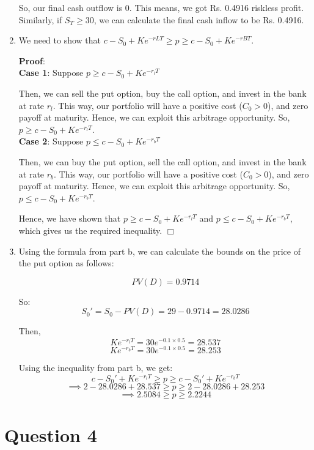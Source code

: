\documentclass[a4paper]{article}
\def\endproofmark{$\Box$}
\newenvironment{proof}{\par{\bf Proof}:}{\endproofmark\smallskip}
\begin{document}
\begin{enumerate}[label=(\alph*)]
    So, our final cash outflow is 0. This means, we got Rs. 0.4916 riskless profit. Similarly, if $S_T \geq 30$, we can calculate the final cash inflow to be Rs. 0.4916.


    \vspace{5mm}
    \item We need to show that $c - S_0 + Ke^{-rLT} \geq p \geq c - S_0 + Ke^{-rBT}$.

    \begin{proof}
        \\
        \textbf{Case 1}: Suppose $p \geq c - S_0 + Ke^{-r_l T}$

        Then, we can sell the put option, buy the call option, and invest in the bank at rate $r_l$. This way, our portfolio will have a positive cost ($C_0 > 0$), and zero payoff at maturity. Hence, we can exploit this arbitrage opportunity. So, $p \geq c - S_0 + Ke^{-r_l T}$. \\

        \textbf{Case 2}: Suppose $p \leq c - S_0 + Ke^{-r_b T}$

        Then, we can buy the put option, sell the call option, and invest in the bank at rate $r_b$. This way, our portfolio will have a positive cost ($C_0 > 0$), and zero payoff at maturity. Hence, we can exploit this arbitrage opportunity. So, $p \leq c - S_0 + Ke^{-r_b T}$.

        Hence, we have shown that $p \geq c - S_0 + Ke^{-r_l T}$ and $p \leq c - S_0 + Ke^{-r_b T}$, which gives us the required inequality.
    \end{proof}

    \newpage
    \item Using the formula from part b, we can calculate the bounds on the price of the put option as follows:
    
    \[ PV(D) = 0.9714 \]

    So: 
    \[S_0' = S_0 - PV(D) = 29 - 0.9714 = 28.0286 \]

    Then, 
    \[ Ke^{-r_lT} = 30e^{-0.1 \times 0.5} = 28.537 \]
    \[ Ke^{-r_bT} = 30e^{-0.1 \times 0.5} = 28.253 \]

    Using the inequality from part b, we get:
    \[ c - S_0' + Ke^{-r_lT} \geq p \geq c - S_0' + Ke^{-r_bT} \]
    \[ \implies 2 - 28.0286 + 28.537 \geq p \geq 2 - 28.0286 + 28.253 \]
    \[ \implies 2.5084 \geq p \geq 2.2244 \]
\end{enumerate}


\vspace{10mm}
\section*{Question 4}
\end{document}
